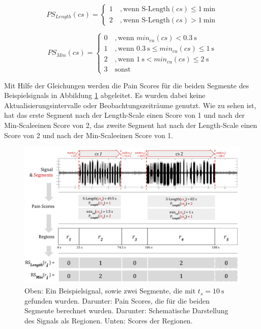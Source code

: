 \begin{equation}
PS_{Length}(cs) = \begin{cases}
 1 \quad ,  \text{wenn } \text{S-Length}(cs) \leq \SI{1}{\minute} \\
 2 \quad ,  \text{wenn } \text{S-Length}(cs) > \SI{1}{\minute}
 \end{cases}	
 \label{eq:ps_length}
\end{equation}

\begin{equation}
PS_{Min}(cs) = \begin{cases}
 0 \quad ,  \text{wenn } min_{cu}(cs) < \SI{0.3}{\second}\\
 1 \quad ,  \text{wenn } \SI{0.3}{\second} \leq min_{cu}(cs) \leq \SI{1}{\second}\\
 2 \quad ,  \text{wenn } \SI{1}{\second} < min_{cu}(cs) \leq \SI{2}{\second} \\
 3 \quad  \text{sonst }
 \end{cases}	
 \label{eq:ps_length}
\end{equation}

Mit Hilfe der Gleichungen werden die Pain Scores für die beiden Segmente des Beispielsignals in Abbildung \ref{img:visualisation_example_01} abgeleitet. Es wurden dabei keine Aktualisierungsintervalle oder Beobachtungszeiträume genutzt. Wie zu sehen ist, hat das erste Segment nach der \glqq Length-Scale\grqq{} einen Score von 1 und nach der \glqq Min-Scale\grqq einen Score von 2, das zweite Segment hat nach der \glqq Length-Scale\grqq{} einen Score von 2 und nach der \glqq Min-Scale\grqq einen Score von 1.

\begin{figure}[h]
	\centering
	\includegraphics[width=1\textwidth]{bilder/visualisation_example_01.png}
	\caption{Oben: Ein Beispielsignal, sowie zwei Segmente, die mit $t_s = \SI{10}{\second}$ gefunden wurden. Darunter: Pain Scores, die für die beiden Segmente berechnet wurden. Darunter: Schematische Darstellung des Signals als Regionen. Unten: Scores der Regionen.}
	\label{img:visualisation_example_01}
\end{figure}

